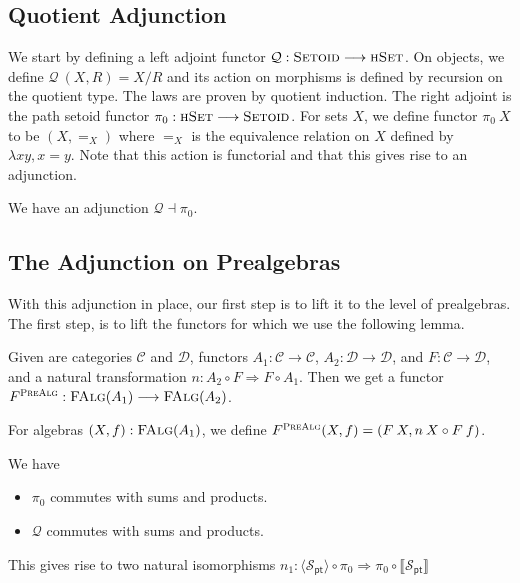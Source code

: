 \documentclass[9pt]{entcs}
\newcommand{\type}[1]{\textsc{#1}}
\newcommand{\category}[1]{\textsc{#1}}
\newcommand{\hset}{\type{hSet}} %
\newcommand{\0}{\textbf{0}} %
\newcommand{\1}{\textbf{1}} %
\newcommand{\setquot}[2]{#1 / #2} %
\newcommand{\compm}[2]{#2 \circ #1} %
\newcommand{\setoids}{\category{Setoid}} %
\newcommand{\functor}[2]{#1 \longrightarrow #2} %
\newcommand{\compf}[2]{#2 \circ #1} %
\newcommand{\nattrans}[2]{#1 \Longrightarrow #2} %
\newcommand{\falg}[1]{\category{FAlg}(#1)} %
\newcommand{\adj}[2]{#1 \dashv #2} %
\newcommand{\pt}[0]{\textsf{pt}}
\newcommand{\pointc}[1]{#1_{\pt}} %
\newcommand{\sig}{\mathcal{S}} %
\newcommand{\semP}[1]{\llbracket #1 \rrbracket} %
\newcommand{\semPT}[1]{\langle #1 \rangle} %
\newcommand{\quotF}{\mathcal{Q}}
\newcommand{\pathF}{\pi_0}
\begin{document}
\subsection{Quotient Adjunction}
We start by defining a left adjoint functor $\quotF : \functor{\setoids}{\hset}$.
On objects, we define $\quotF \> (X , R) = \setquot{X}{R}$ and its action on morphisms is defined by recursion on the quotient type.
The laws are proven by quotient induction.
The right adjoint is the path setoid functor $\pathF : \functor{\hset}{\setoids}$.
For sets $X$, we define functor $\pathF \> X$ to be $(X, =_X)$ where $=_X$ is the equivalence relation on $X$ defined by $\lambda x y, x = y$.
Note that this action is functorial and that this gives rise to an adjunction.

\begin{lemma}
We have an adjunction $\adj{\quotF}{\pathF}$.
\end{lemma}

\subsection{The Adjunction on Prealgebras}
With this adjunction in place, our first step is to lift it to the level of prealgebras.
The first step, is to lift the functors for which we use the following lemma.

\begin{lemma}
\label{lem:prealgadj}
Given are categories $\mathcal{C}$ and $\mathcal{D}$, functors $A_1 : \functor{\mathcal{C}}{\mathcal{C}}$, $A_2 : \functor{\mathcal{D}}{\mathcal{D}}$, and $F : \functor{\mathcal{C}}{\mathcal{D}}$, and a natural transformation $n : \nattrans{\compf{F}{A_2}}{\compf{A_1}{F}}$.
Then we get a functor $F^{\category{PreAlg}} : \functor{\falg{A_1}}{\falg{A_2}}$.
\end{lemma}

For algebras $(X, f) : \falg{A_1}$, we define $F^{\category{PreAlg}}(X,f) = (F \> X, \compm{F \> f}{n \> X})$.

\begin{lemma}
\label{lem:comm}
We have
\begin{itemize}
	\item $\pathF$ commutes with sums and products.
	\item $\quotF$ commutes with sums and products.
\end{itemize}
This gives rise to two natural isomorphisms $n_1 : \nattrans{\compf{\pathF}{\semPT{\pointc{\sig}}}}{\compf{\semP{\pointc{\sig}}}{\pathF}}$
\end{lemma}
\end{document}
